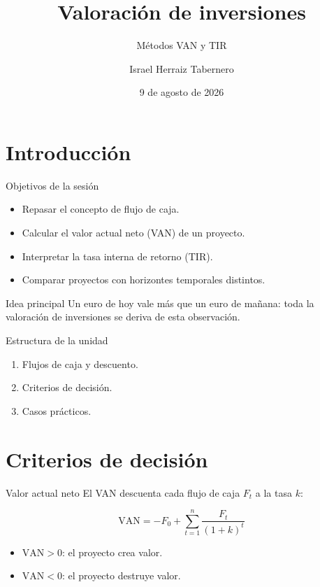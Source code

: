 \documentclass[aspectratio=169]{beamer}
\title{Valoración de inversiones}
\subtitle{Métodos VAN y TIR}
\author{Israel Herraiz Tabernero}
\date{9 de agosto de 2026}
\begin{document}
\begin{frame}[plain]
  \titlepage
\end{frame}

\section{Introducción}

\begin{frame}{Objetivos de la sesión}
  \begin{itemize}
    \item Repasar el concepto de flujo de caja.
    \item Calcular el valor actual neto (VAN) de un proyecto.
    \item Interpretar la tasa interna de retorno (TIR).
    \item Comparar proyectos con horizontes temporales distintos.
  \end{itemize}

  \begin{block}{Idea principal}
    Un euro de hoy vale más que un euro de mañana: toda la valoración de
    inversiones se deriva de esta observación.
  \end{block}
\end{frame}

\begin{frame}{Estructura de la unidad}
  \begin{enumerate}
    \item Flujos de caja y descuento.
    \item Criterios de decisión.
    \item Casos prácticos.
  \end{enumerate}
\end{frame}

\section{Criterios de decisión}

\begin{frame}{Valor actual neto}
  El VAN descuenta cada flujo de caja \(F_t\) a la tasa \(k\):

  \begin{equation*}
    \mathrm{VAN} = -F_0 + \sum_{t=1}^{n} \frac{F_t}{(1+k)^t}
  \end{equation*}

  \begin{itemize}
    \item \(\mathrm{VAN} > 0\): el proyecto crea valor.
    \item \(\mathrm{VAN} < 0\): el proyecto destruye valor.
  \end{itemize}
\end{frame}
\end{document}
